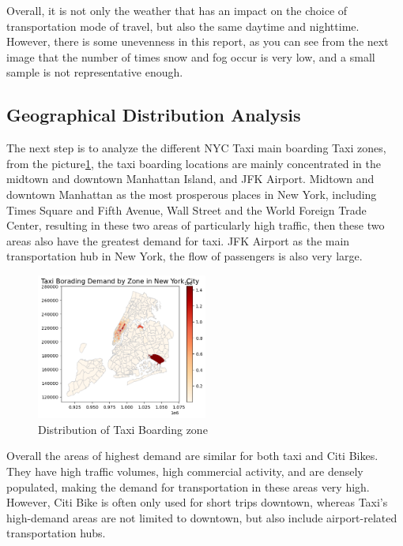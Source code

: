 \documentclass[11pt]{article}
\begin{document}
Overall, it is not only the weather that has an impact on the choice of transportation mode of travel, but also the same daytime and nighttime. However, there is some unevenness in this report, as you can see from the next image that the number of times snow and fog occur is very low, and a small sample is not representative enough.

\subsection{Geographical Distribution Analysis }
The next step is to analyze the different NYC Taxi main boarding Taxi zones, from the picture\ref{fig:3}, the taxi boarding locations are mainly concentrated in the midtown and downtown Manhattan Island, and JFK Airport. Midtown and downtown Manhattan as the most prosperous places in New York, including Times Square and Fifth Avenue, Wall Street and the World Foreign Trade Center, resulting in these two areas of particularly high traffic, then these two areas also have the greatest demand for taxi. JFK Airport as the main transportation hub in New York, the flow of passengers is also very large.
\begin{figure}[h!]
    \centering
    \includegraphics[width=0.5\textwidth]{plot/Taxi borading zone.png}
    \caption{Distribution of Taxi Boarding zone}
    \label{fig:3}
\end{figure}

Overall the areas of highest demand are similar for both taxi and Citi Bikes. They have high traffic volumes, high commercial activity, and are densely populated, making the demand for transportation in these areas very high. However, Citi Bike is often only used for short trips downtown, whereas Taxi's high-demand areas are not limited to downtown, but also include airport-related transportation hubs. 
\end{document}
